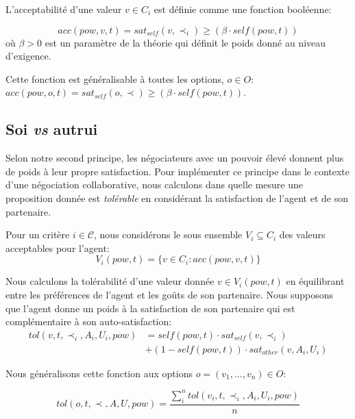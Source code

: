 \documentclass [french]{sig-alternate-05-2015}
\begin{document}
		L'acceptabilité d'une valeur $ v \in C_i $ est définie comme une fonction booléenne:	
		
		\begin{equation}
		acc(pow,v, t) = sat_{self}(v, \prec_i) \geq  (\beta \cdot self(pow,t))
		\end{equation}	
		où $ \beta> 0 $ est un paramètre de la théorie qui définit le poids donné au niveau d'exigence.
		
		Cette fonction est généralisable à toutes les options,  $o \in O$: $acc(pow,o, t) = sat_{self}(o, \prec) \geq  (\beta \cdot self(pow,t))$.
		
		\subsection{Soi \emph{vs} autrui}
	
		Selon notre second principe, les négociateurs avec un pouvoir élevé donnent plus de poids à leur propre satisfaction. Pour implémenter ce principe dans le contexte d'une négociation collaborative, nous calculons dans quelle mesure une proposition donnée est \textit{tolérable} en considérant la satisfaction de l'agent et de son partenaire.
		
		Pour un critère $i \in \mathcal{C}$, nous considérons le sous ensemble $V_i\subseteq C_i$ des valeurs acceptables pour l'agent: 
			\begin{equation}
			V_i(pow,t) = \{ v\in C_i : acc(pow,v,t) \}
			\end{equation}
		
		
		Nous calculons la tolérabilité d'une valeur donnée $ v \in V_i (pow, t) $ en équilibrant entre les préférences de l'agent et les goûts de son partenaire. Nous supposons que l'agent donne un poids à la satisfaction de son partenaire qui est complémentaire à son auto-satisfaction:
			\begin{equation}
			\begin{split}
			tol(v, t, \prec_i, A_i, U_i, pow) & = self(pow, t)  \cdot sat_{self}(v, \prec_i) \\
			& +  (1 - self(pow, t)) \cdot sat_{other}(v, A_i, U_i)
			\end{split} 
			\end{equation}
		
		
		Nous généralisons cette fonction aux options $o=(v_1,\ldots,v_n) \in O$:
		
		\begin{equation}
		tol(o, t, \prec, A, U, pow) = \frac{ \sum_{i}^{n} tol(v_i, t, \prec_i, A_i, U_i, pow) } {n}
		\end{equation}
		
\end{document}
